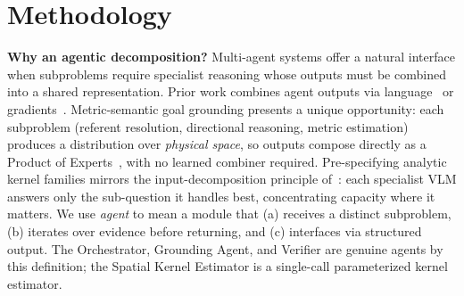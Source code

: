 \section{Methodology}

\noindent\textbf{Why an agentic decomposition?}
Multi-agent systems offer a natural interface when subproblems require specialist reasoning whose outputs must be combined into a shared representation. Prior work combines agent outputs via language~\cite{du2024improving} or gradients~\cite{patil2025factorizingdiffusionpoliciesobservation}. Metric-semantic goal grounding presents a unique opportunity: each subproblem (referent resolution, directional reasoning, metric estimation) produces a distribution over \emph{physical space}, so outputs compose directly as a Product of Experts~\cite{hinton2002poe, du2024compositionalgenerativemodelingsingle}, with no learned combiner required. Pre-specifying analytic kernel families mirrors the input-decomposition principle of~\cite{du2024reducereuserecyclecompositional}: each specialist VLM answers only the sub-question it handles best, concentrating capacity where it matters. We use \emph{agent} to mean a module that (a) receives a distinct subproblem, (b) iterates over evidence before returning, and (c) interfaces via structured output. The Orchestrator, Grounding Agent, and Verifier are genuine agents by this definition; the Spatial Kernel Estimator is a single-call parameterized kernel estimator.

